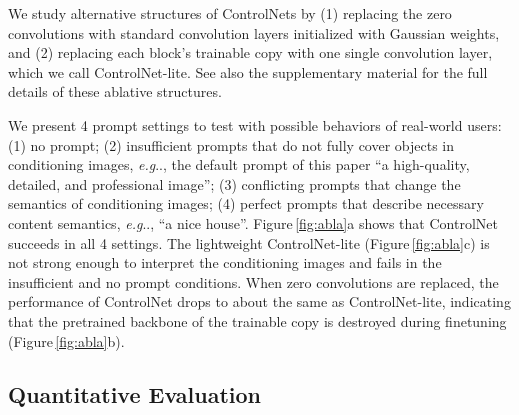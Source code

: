 \documentclass[10pt,twocolumn,letterpaper]{article}
\makeatletter
\DeclareRobustCommand\onedot{\futurelet\@let@token\@onedot}
\def\@onedot{\ifx\@let@token.\else.\null\fi\xspace}
\def\eg{\emph{e.g}\onedot}
\makeatother
\begin{document}
	We study alternative structures of ControlNets by (1) replacing the zero convolutions with standard convolution layers initialized with Gaussian weights, and (2) replacing each block's trainable copy with one single convolution layer, which we call ControlNet-lite.
	See also the supplementary material for the full details of these ablative structures.
	
	We present 4 prompt settings to test with possible behaviors of real-world users:
	(1) no prompt;
	(2) insufficient prompts that do not fully cover objects in conditioning images, \eg, the default prompt of this paper ``a high-quality, detailed, and professional image'';
	(3) conflicting prompts that change the semantics of conditioning images;
	(4) perfect prompts that describe necessary content semantics, \eg, ``a nice house''.
	Figure\,\ref{fig:abla}a shows that ControlNet succeeds in all 4 settings. 
	The lightweight ControlNet-lite (Figure\,\ref{fig:abla}c) is not strong enough to interpret the conditioning images and fails in the insufficient and no prompt conditions.
	When zero convolutions are replaced, the performance of ControlNet drops to about the same as ControlNet-lite, indicating that the pretrained backbone of the trainable copy is destroyed during finetuning (Figure\,\ref{fig:abla}b).
	
	\begin{table}[!t]
		\centering
		\vspace{-8pt}
		\caption{Evaluation of semantic segmentation label reconstruction (ADE20K) with Intersection over Union (IoU $\uparrow$).}
		\vspace{-9pt}
		\label{tab:iou}
	\end{table}
	
	
	
	\subsection{Quantitative Evaluation}
	
\end{document}
